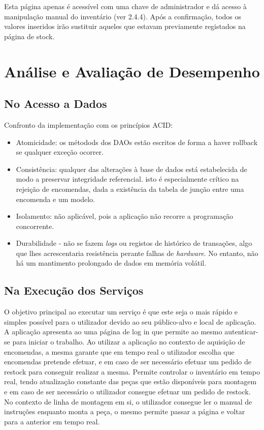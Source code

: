                     Esta página apenas é acessível com uma chave de administrador e dá acesso à manipulação manual do inventário (ver 2.4.4). Após a confirmação, todos os valores inseridos irão sustituir aqueles que estavam previamente registados na página de stock.
        
    \newpage
    \section{Análise e Avaliação de Desempenho}

        \subsection{No Acesso a Dados}
        
        Confronto da implementação com os princípios ACID:
        \begin{itemize}
            \item Atomicidade: os métodods dos DAOs estão escritos de forma a haver rollback se qualquer exceção ocorrer.
            \item Consistência: qualquer das alterações à base de dados está estabelecida de modo a preservar integridade referencial. isto é especialmente crítico na rejeição de encomendas, dada a existência da tabela de junção entre uma encomenda e um modelo.
            \item Isolamento: não aplicável, pois a aplicação não recorre a programação concorrente.
            \item Durabilidade - não se fazem \textit{logs} ou registos de histórico de transações, algo que lhes acrescentaria resistência perante falhas de \textit{hardware}. No entanto, não há um mantimento prolongado de dados em memória volátil.
        \end{itemize}
        
        \subsection{Na Execução dos Serviços}
            
            O objetivo principal ao executar um serviço é que este seja o mais rápido e simples possível para o utilizador devido ao seu público-alvo e local de aplicação. A aplicação apresenta ao uma página de log in que permite ao mesmo autenticar-se para iniciar o trabalho. Ao utilizar a aplicação no contexto de aquisição de encomendas, a mesma garante que em tempo real o utilizador escolha que encomendas pretende efetuar, e em caso de ser necessário efetuar um pedido de restock para conseguir realizar a mesma. Permite controlar o inventário em tempo real, tendo atualização constante das peças que estão disponíveis para montagem e em caso de ser necessário o utilizador consegue efetuar um pedido de restock. No contexto de linha de montagem em si, o utilizador consegue ler o manual de instruções enquanto monta a peça, o mesmo permite passar a página e voltar para a anterior em tempo real. 
    
